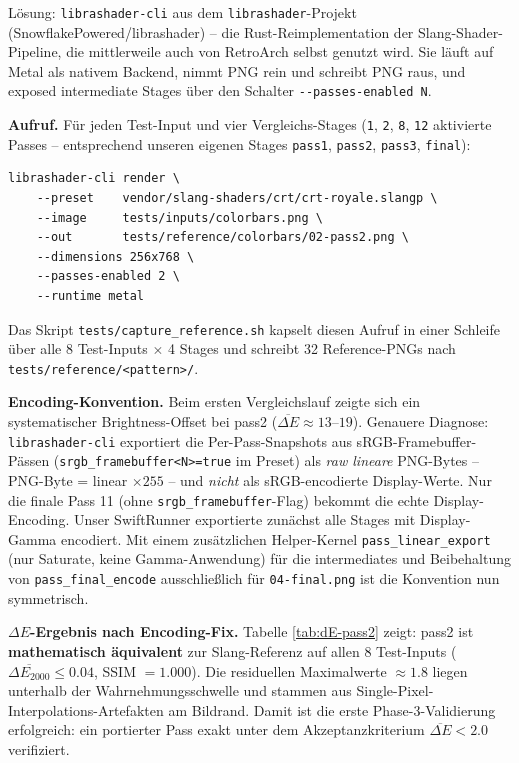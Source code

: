 \documentclass[11pt, a4paper]{article}
\begin{document}
L\"osung: \texttt{librashader-cli} aus dem \texttt{librashader}-Projekt (Snowflake\-Powered\slash librashader) -- die Rust-Reimplementation der Slang-Shader-Pipeline, die mittlerweile auch von RetroArch selbst genutzt wird. Sie l\"auft auf Metal als nativem Backend, nimmt PNG rein und schreibt PNG raus, und exposed intermediate Stages \"uber den Schalter \verb|--passes-enabled N|.

\vspace{.25cm}
\textbf{Aufruf.} F\"ur jeden Test-Input und vier Vergleichs-Stages (\texttt{1}, \texttt{2}, \texttt{8}, \texttt{12} aktivierte Passes -- entsprechend unseren eigenen Stages \texttt{pass1}, \texttt{pass2}, \texttt{pass3}, \texttt{final}):
\begin{verbatim}
librashader-cli render \
    --preset    vendor/slang-shaders/crt/crt-royale.slangp \
    --image     tests/inputs/colorbars.png \
    --out       tests/reference/colorbars/02-pass2.png \
    --dimensions 256x768 \
    --passes-enabled 2 \
    --runtime metal
\end{verbatim}
Das Skript \texttt{tests/capture\_reference.sh} kapselt diesen Aufruf in einer Schleife \"uber alle 8 Test-Inputs $\times$ 4 Stages und schreibt 32 Reference-PNGs nach \texttt{tests/reference/<pattern>/}.

\vspace{.25cm}
\textbf{Encoding-Konvention.} Beim ersten Vergleichslauf zeigte sich ein systematischer Brightness-Offset bei pass2 ($\overline{\Delta E} \approx 13$--$19$). Genauere Diagnose: \texttt{librashader-cli} exportiert die Per-Pass-Snapshots aus sRGB-Framebuffer-P\"assen (\texttt{srgb\_framebuffer<N>=true} im Preset) als \emph{raw lineare} PNG-Bytes -- PNG-Byte = linear $\times 255$ -- und \emph{nicht} als sRGB-encodierte Display-Werte. Nur die finale Pass 11 (ohne \texttt{srgb\_framebuffer}-Flag) bekommt die echte Display-Encoding. Unser SwiftRunner exportierte zun\"achst alle Stages mit Display-Gamma encodiert. Mit einem zus\"atzlichen Helper-Kernel \texttt{pass\_linear\_export} (nur Saturate, keine Gamma-Anwendung) f\"ur die intermediates und Beibehaltung von \texttt{pass\_final\_encode} ausschlie{\ss}lich f\"ur \texttt{04-final.png} ist die Konvention nun symmetrisch.

\vspace{.25cm}
\textbf{$\Delta E$-Ergebnis nach Encoding-Fix.} Tabelle \ref{tab:dE-pass2} zeigt: pass2 ist \textbf{mathematisch \"aquivalent} zur Slang-Referenz auf allen 8 Test-Inputs ($\overline{\Delta E_{2000}} \leq 0.04$, SSIM $= 1.000$). Die residuellen Maximalwerte $\approx 1.8$ liegen unterhalb der Wahrnehmungsschwelle und stammen aus Single-Pixel-Interpolations-Artefakten am Bildrand. Damit ist die erste Phase-3-Validierung erfolgreich: ein portierter Pass exakt unter dem Akzeptanzkriterium $\overline{\Delta E} < 2.0$ verifiziert.
\end{document}
